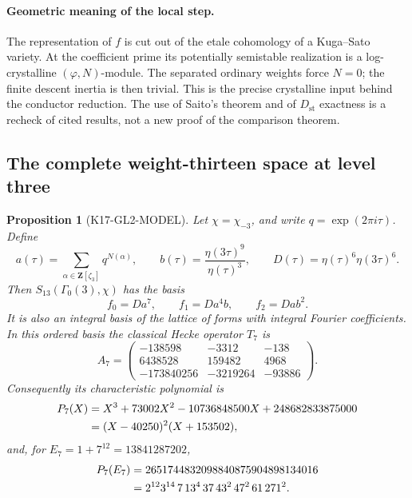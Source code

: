\documentclass[11pt,a4paper]{article}
\newtheorem{proposition}[theorem]{Proposition}
\theoremstyle{definition}
\begin{document}
\paragraph{Geometric meaning of the local step.}
The representation of $f$ is cut out of the etale cohomology of a
Kuga--Sato variety. At the coefficient prime its potentially semistable
realization is a log-crystalline $(\varphi,N)$-module. The separated
ordinary weights force $N=0$; the finite descent inertia is then trivial.
This is the precise crystalline input behind the conductor reduction.
The use of Saito's theorem and of $D_{\mathrm{st}}$ exactness is a
recheck of cited results, not a new proof of the comparison theorem.

\subsection{The complete weight-thirteen space at level three}
\label{sec:gl2-weight13}

\begin{proposition}[K17-GL2-MODEL]\label{prop:gl2-weight13}
Let $\chi=\chi_{-3}$, and write $q=\exp(2\pi i\tau)$. Define
\[
 a(\tau)=\sum_{\alpha\in\mathbf Z[\zeta_3]}q^{N(\alpha)},\qquad
 b(\tau)=\frac{\eta(3\tau)^9}{\eta(\tau)^3},\qquad
 D(\tau)=\eta(\tau)^6\eta(3\tau)^6.
\]
Then $S_{13}(\Gamma_0(3),\chi)$ has the basis
\[
 f_0=Da^7,\qquad f_1=Da^4b,\qquad f_2=Dab^2.
\]
It is also an integral basis of the lattice of forms with integral Fourier
coefficients. In this ordered basis the classical Hecke operator $T_7$ is
\[
 A_7=
 \begin{pmatrix}
 -138598&-3312&-138\\
 6438528&159482&4968\\
 -173840256&-3219264&-93886
 \end{pmatrix}.
\]
Consequently its characteristic polynomial is
\begin{align}
 P_7(X)
 &=X^3+73002X^2-10736848500X+248682833875000 \notag\\
 &=(X-40250)^2(X+153502), \label{eq:gl2-p7}
\end{align}
and, for $E_7=1+7^{12}=13841287202$,
\begin{align}
 P_7(E_7)
 &=2651744832098840875904898134016 \notag\\
 &=2^{12}3^{14}\,7\,13^4\,37\,43^2\,47^2\,61\,271^2.
 \label{eq:gl2-p7-evaluation}
\end{align}
\end{proposition}
\end{document}
